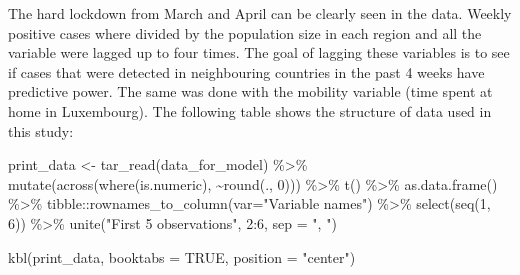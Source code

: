 \documentclass{article}
\newenvironment{Shaded}{\begin{snugshade}}{\end{snugshade}}
\newcommand{\AttributeTok}[1]{\textcolor[rgb]{0.77,0.63,0.00}{#1}}
\newcommand{\ConstantTok}[1]{\textcolor[rgb]{0.00,0.00,0.00}{#1}}
\newcommand{\DecValTok}[1]{\textcolor[rgb]{0.00,0.00,0.81}{#1}}
\newcommand{\FunctionTok}[1]{\textcolor[rgb]{0.00,0.00,0.00}{#1}}
\newcommand{\NormalTok}[1]{#1}
\newcommand{\OtherTok}[1]{\textcolor[rgb]{0.56,0.35,0.01}{#1}}
\newcommand{\SpecialCharTok}[1]{\textcolor[rgb]{0.00,0.00,0.00}{#1}}
\newcommand{\StringTok}[1]{\textcolor[rgb]{0.31,0.60,0.02}{#1}}
\begin{document}
The hard lockdown from March and April can be clearly seen in the data.
Weekly positive cases where divided by the population size in each
region and all the variable were lagged up to four times. The goal of
lagging these variables is to see if cases that were detected in
neighbouring countries in the past 4 weeks have predictive power. The
same was done with the mobility variable (time spent at home in
Luxembourg). The following table shows the structure of data used in
this study:

\begin{Shaded}
\begin{Highlighting}[]
\NormalTok{print\_data }\OtherTok{\textless{}{-}} \FunctionTok{tar\_read}\NormalTok{(data\_for\_model) }\SpecialCharTok{\%\textgreater{}\%}
  \FunctionTok{mutate}\NormalTok{(}\FunctionTok{across}\NormalTok{(}\FunctionTok{where}\NormalTok{(is.numeric), }\SpecialCharTok{\textasciitilde{}}\FunctionTok{round}\NormalTok{(., }\DecValTok{0}\NormalTok{))) }\SpecialCharTok{\%\textgreater{}\%}
  \FunctionTok{t}\NormalTok{() }\SpecialCharTok{\%\textgreater{}\%}
  \FunctionTok{as.data.frame}\NormalTok{() }\SpecialCharTok{\%\textgreater{}\%}
\NormalTok{  tibble}\SpecialCharTok{::}\FunctionTok{rownames\_to\_column}\NormalTok{(}\AttributeTok{var=}\StringTok{"Variable names"}\NormalTok{) }\SpecialCharTok{\%\textgreater{}\%}
  \FunctionTok{select}\NormalTok{(}\FunctionTok{seq}\NormalTok{(}\DecValTok{1}\NormalTok{, }\DecValTok{6}\NormalTok{)) }\SpecialCharTok{\%\textgreater{}\%}
  \FunctionTok{unite}\NormalTok{(}\StringTok{"First 5 observations"}\NormalTok{, }\DecValTok{2}\SpecialCharTok{:}\DecValTok{6}\NormalTok{, }\AttributeTok{sep =} \StringTok{", "}\NormalTok{) }

\FunctionTok{kbl}\NormalTok{(print\_data, }\AttributeTok{booktabs =} \ConstantTok{TRUE}\NormalTok{, }\AttributeTok{position =} \StringTok{"center"}\NormalTok{)}
\end{Highlighting}
\end{Shaded}
\end{document}
